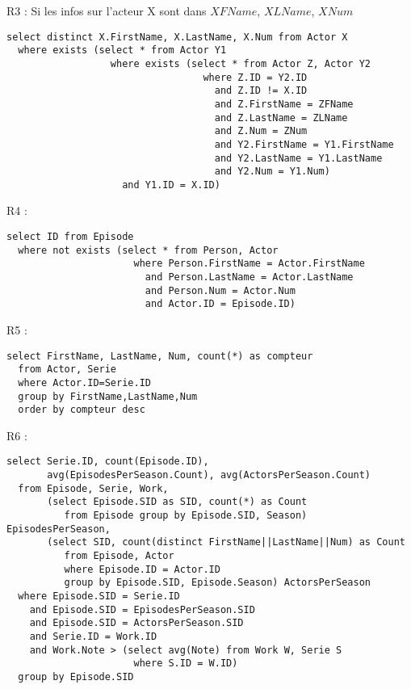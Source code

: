 \documentclass[a4paper,12pt]{article}
\begin{document}
\begin{list}{-}{}
\begin{lstlisting}
    \end{lstlisting}
  \item R3 :
    Si les infos sur l'acteur X sont dans $XFName$, $XLName$, $XNum$
    \begin{lstlisting}
select distinct X.FirstName, X.LastName, X.Num from Actor X
  where exists (select * from Actor Y1
                  where exists (select * from Actor Z, Actor Y2 
                                  where Z.ID = Y2.ID
                                    and Z.ID != X.ID
                                    and Z.FirstName = ZFName
                                    and Z.LastName = ZLName
                                    and Z.Num = ZNum
                                    and Y2.FirstName = Y1.FirstName
                                    and Y2.LastName = Y1.LastName
                                    and Y2.Num = Y1.Num)
                    and Y1.ID = X.ID)
    \end{lstlisting}
  \item R4 :
    \begin{lstlisting}
select ID from Episode
  where not exists (select * from Person, Actor
                      where Person.FirstName = Actor.FirstName
                        and Person.LastName = Actor.LastName
                        and Person.Num = Actor.Num
                        and Actor.ID = Episode.ID)
    \end{lstlisting}
  \item R5 :
    \begin{lstlisting}
select FirstName, LastName, Num, count(*) as compteur
  from Actor, Serie
  where Actor.ID=Serie.ID
  group by FirstName,LastName,Num
  order by compteur desc
    \end{lstlisting}
  \item R6 :
    \begin{lstlisting}
select Serie.ID, count(Episode.ID), 
       avg(EpisodesPerSeason.Count), avg(ActorsPerSeason.Count)
  from Episode, Serie, Work,
       (select Episode.SID as SID, count(*) as Count
          from Episode group by Episode.SID, Season) EpisodesPerSeason,
       (select SID, count(distinct FirstName||LastName||Num) as Count
          from Episode, Actor
          where Episode.ID = Actor.ID
          group by Episode.SID, Episode.Season) ActorsPerSeason
  where Episode.SID = Serie.ID
    and Episode.SID = EpisodesPerSeason.SID
    and Episode.SID = ActorsPerSeason.SID
    and Serie.ID = Work.ID
    and Work.Note > (select avg(Note) from Work W, Serie S
                      where S.ID = W.ID)
  group by Episode.SID
\end{lstlisting}

\end{list}
\end{document}
